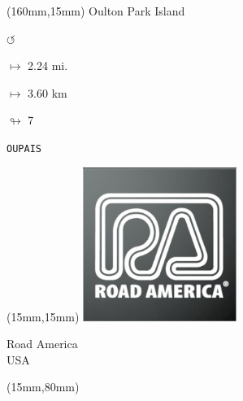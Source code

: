 \begin{textblock*}{40mm}(160mm,15mm)%
Oulton Park Island
\par \Huge$\circlearrowleft$
\Large
\par$\mapsto$ 2.24 mi.
\par$\mapsto$ 3.60 km
\par$\looparrowright$ 7
\par\hfill\tiny\tt OUPAIS\\
\end{textblock*}
\null\newpage

\begin{textblock*}{50mm}(15mm,15mm)%
\includegraphics[width=50mm]{LG/2015-05-20_00092.png}
\par Road America\\ USA
\end{textblock*}
\begin{textblock*}{185mm}(15mm,80mm)%
\end{textblock*}

